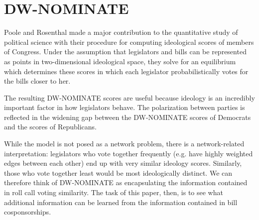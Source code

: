 \section{DW-NOMINATE}

Poole and Rosenthal made a major contribution to the quantitative study of political science with their procedure for computing ideological scores of members of Congress. Under the assumption that legislators and bills can be represented as points in two-dimensional ideological space, they solve for an equilibrium which determines these scores in which each legislator probabilistically votes for the bills closer to her.

The resulting DW-NOMINATE scores are useful because ideology is an incredibly important factor in how legislators behave. The polarization between parties is reflected in the widening gap between the DW-NOMINATE scores of Democrats and the scores of Republicans. 

While the model is not posed as a network problem, there is a network-related interpretation: legislators who vote together frequently (e.g. have highly weighted edges between each other) end up with very similar ideology scores. Similarly, those who vote together least would be most ideologically distinct. We can therefore think of DW-NOMINATE as encapsulating the information contained in roll call voting similarity. The task of this paper, then, is to see what additional information can be learned from the information contained in bill cosponsorships.
